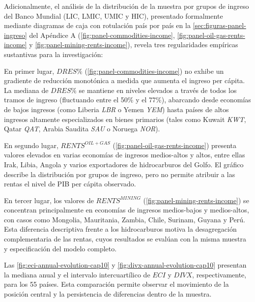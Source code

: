 \documentclass[../../TFM.tex]{subfiles}
\begin{document}
	Adicionalmente, el análisis de la distribución de la muestra por grupos de ingreso del Banco Mundial (LIC, LMIC, UMIC y HIC), presentado formalmente mediante diagramas de caja con rotulación país por país en la \autoref{sec:figuras-panel-ingreso} del Apéndice A (\autoref{fig:panel-commodities-income}, \autoref{fig:panel-oil-gas-rents-income} y \autoref{fig:panel-mining-rents-income}), revela tres regularidades empíricas sustantivas para la investigación:

	En primer lugar, $DRES\%$ (\autoref{fig:panel-commodities-income}) no exhibe un gradiente de reducción monotónica a medida que aumenta el ingreso per cápita. La mediana de $DRES\%$ se mantiene en niveles elevados a través de todos los tramos de ingreso (fluctuando entre el 50\% y el 77\%), abarcando desde economías de bajos ingresos (como Liberia \textit{LBR} o Yemen \textit{YEM}) hasta países de altos ingresos altamente especializados en bienes primarios (tales como Kuwait \textit{KWT}, Qatar \textit{QAT}, Arabia Saudita \textit{SAU} o Noruega \textit{NOR}).

	En segundo lugar, $RENTS^{OIL+GAS}$ (\autoref{fig:panel-oil-gas-rents-income}) presenta valores elevados en varias
	economías de ingresos medios-altos y altos, entre ellas Irak, Libia, Angola y
	varios exportadores de hidrocarburos del Golfo. El gráfico describe la
	distribución por grupos de ingreso, pero no permite atribuir a las rentas el
	nivel de PIB per cápita observado.

	En tercer lugar, los valores de $RENTS^{MINING}$ (\autoref{fig:panel-mining-rents-income}) se concentran principalmente en
	economías de ingresos medios-bajos y medios-altos, con casos como Mongolia,
	Mauritania, Zambia, Chile, Surinam, Guyana y Perú. Esta diferencia descriptiva
	frente a los hidrocarburos motiva la desagregación complementaria de las
	rentas, cuyos resultados se evalúan con la misma muestra y especificación del
	modelo completo.

	Las \autoref{fig:eci-annual-evolution-cap10} y \autoref{fig:divx-annual-evolution-cap10} presentan la mediana anual y el intervalo intercuartílico de $ECI$ y $DIVX$, respectivamente, para los 55 países. Esta comparación permite observar el movimiento de la posición central y la persistencia de diferencias dentro de la muestra.
\end{document}
